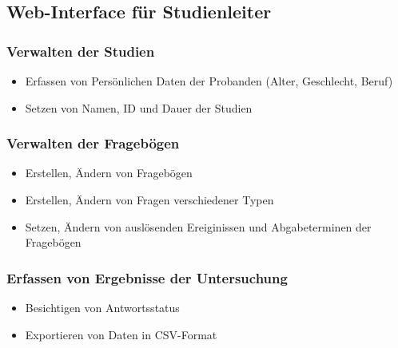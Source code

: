 \documentclass[a4paper]{scrreprt}
\begin{document}
            \subsection{Web-Interface für Studienleiter}

                \subsubsection{Verwalten der Studien}
                    \begin{itemize}
                        \item Erfassen von Pers\"onlichen Daten der Probanden (Alter, Geschlecht, Beruf)
                        \item Setzen von Namen, ID und Dauer der Studien
                    \end{itemize}

                \subsubsection{Verwalten der Frageb\"ogen}
                    \begin{itemize}
                        \item Erstellen, Ändern von Fragebögen
                        \item Erstellen, \"Andern von Fragen verschiedener Typen
                        \item Setzen, \"Andern von auslösenden Ereiginissen und Abgabeterminen der Frageb\"ogen
                    \end{itemize}

                \subsubsection{Erfassen von Ergebnisse der Untersuchung}
                    \begin{itemize}
                        \item Besichtigen von \gls{Antwortsstatus}
                        \item Exportieren von Daten in CSV-Format
                    \end{itemize}
            \vspace*{0.5cm}

\end{document}
